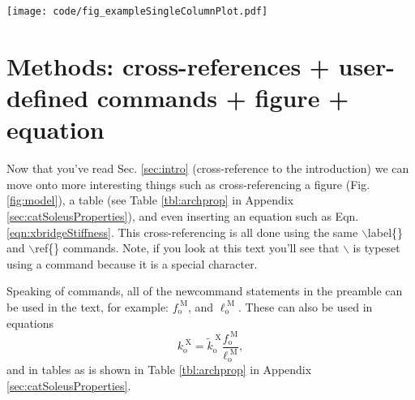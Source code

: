 \documentclass[11pt,twocolumn,a4paper]{article}
\newcommand{\fiso}{f_{\mathrm{o}}^{\;\!\mathrm{M}}}
\newcommand{\kxiso}{k_{\mathrm{o}}^{\;\!\mathrm{X}}}
\newcommand{\kxisoNorm}{\tilde{k}_{\mathrm{o}}^{\;\!\mathrm{X}}}
\newcommand{\lopt}{\ell_{\mathrm{o}}^{\;\!\mathrm{M}}}
\begin{document}
\begin{figure*}[!h]
    \centering
    \texttt{[image: code/fig\_exampleSingleColumnPlot.pdf]}
    \caption{Since the figure is correctly sized already, no extra options are needed: the figure and all of its fonts will appear exactly at the correct size. However, the options 'width=$\backslash$textwidth' and 'keepaspectratio=true' are often used to make the figure fit the full width of the text area (which will make the fonts bigger in this case). Note that the \textbf{figure*} environment is used here rather than \textbf{figure}: the \textbf{*} is needed to add a full-width figure to a 2 column document. Finally, one of the most frustrating things to a beginner is getting \LaTeX{} to put the figure where you want it to appear. The easiest way to do this is to move this command either earlier or later in the text, recompile, and then see if you like the result. The next approach is to suggest a location using the optional figures commands: $\backslash$begin\{figure*\}[h] for here, [!h] for here (more strongly), [t] for top, and [b] for bottom.
    \label{fig:model}}
\end{figure*}

\section{Methods: cross-references + user-defined commands + figure + equation}

\label{sec:model}


Now that you've read Sec. \ref{sec:intro} (cross-reference to the introduction) we can move onto more interesting things such as cross-referencing a figure (Fig. \ref{fig:model}), a table (see Table \ref{tbl:archprop} in Appendix \ref{sec:catSoleusProperties}), and even inserting an equation such as Eqn. \ref{eqn:xbridgeStiffness}. 
This cross-referencing is all done using the same $\backslash$label\{\} and $\backslash$ref\{\} commands. Note, if you look at this text you'll see that $\backslash$ is typeset using a command because it is a special character.




Speaking of commands, all of the newcommand statements in the preamble can be used in the text, for example: $\fiso$, and $\lopt$. These can also be used in equations
\begin{equation}
\kxiso = \kxisoNorm \dfrac{\fiso}{\lopt},  \label{eqn:xbridgeStiffness}
\end{equation}
and in tables as is shown in Table \ref{tbl:archprop} in Appendix \ref{sec:catSoleusProperties}.
\end{document}
